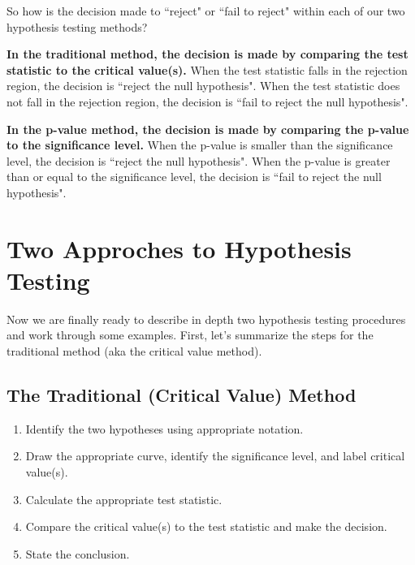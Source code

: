 \documentclass[12pt, letterpaper]{article}
\theoremstyle{definition}
\begin{document}
\noindent So how is the decision made to ``reject" or ``fail to reject" within each of our two hypothesis testing methods?

\vspace*{.1in}

\noindent \textbf{In the traditional method, the decision is made by comparing the test statistic to the critical value(s).}  When the test statistic falls in the rejection region, the decision is ``reject the null hypothesis".  When the test statistic does not fall in the rejection region, the decision is ``fail to reject the null hypothesis".

\vspace*{.1in}

\noindent \textbf{In the p-value method, the decision is made by comparing the p-value to the significance level.}  When the p-value is smaller than the significance level, the decision is ``reject the null hypothesis".  When the p-value is greater than or equal to the significance level, the decision is ``fail to reject the null hypothesis".

\section*{Two Approches to Hypothesis Testing}

\noindent Now we are finally ready to describe in depth two hypothesis testing procedures and work through some examples.  First, let's summarize the steps for the traditional method (aka the critical value method).

\begin{statement}
\section*{The Traditional (Critical Value) Method}

\begin{enumerate}

\item Identify the two hypotheses using appropriate notation.

\item Draw the appropriate curve, identify the significance level, and label critical value(s).

\item Calculate the appropriate test statistic.

\item Compare the critical value(s) to the test statistic and make the decision.

\item State the conclusion.

\end{enumerate}

\end{statement}
\end{document}
